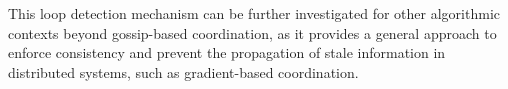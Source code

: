 \documentclass[runningheads]{llncs}
\newenvironment{inlinelist}{\begin{enumerate*}[label=\emph{(\roman*)}]}{\end{enumerate*}}
\begin{document}
This loop detection mechanism can be further investigated for other algorithmic contexts beyond gossip-based coordination,
as it provides a general approach to enforce consistency and prevent the propagation of stale information in distributed systems,
such as gradient-based coordination.







%
%
%
%
%
\end{document}
